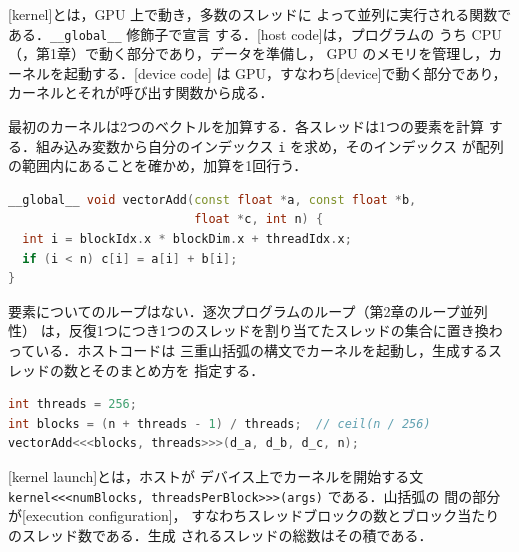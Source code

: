 \documentclass[../main.tex]{subfiles}
\begin{document}
\begin{definition}
  [kernel]とは，GPU 上で動き，多数のスレッドに
  よって並列に実行される関数である．\texttt{\_\_global\_\_} 修飾子で宣言
  する．[host code]は，プログラムの
  うち CPU（，第1章）で動く部分であり，データを準備し，
  GPU のメモリを管理し，カーネルを起動する．[device code]
  は GPU，すなわち[device]で動く部分であり，
  カーネルとそれが呼び出す関数から成る．
\end{definition}

最初のカーネルは2つのベクトルを加算する．各スレッドは1つの要素を計算
する．組み込み変数から自分のインデックス \texttt{i} を求め，そのインデックス
が配列の範囲内にあることを確かめ，加算を1回行う．
\begin{lstlisting}[language=C++, numbers=none]
__global__ void vectorAdd(const float *a, const float *b,
                          float *c, int n) {
  int i = blockIdx.x * blockDim.x + threadIdx.x;
  if (i < n) c[i] = a[i] + b[i];
}
\end{lstlisting}
要素についてのループはない．逐次プログラムのループ（第2章のループ並列性）
は，反復1つにつき1つのスレッドを割り当てたスレッドの集合に置き換わっている．ホストコードは
三重山括弧の構文でカーネルを起動し，生成するスレッドの数とそのまとめ方を
指定する．
\begin{lstlisting}[language=C++, numbers=none]
int threads = 256;
int blocks = (n + threads - 1) / threads;  // ceil(n / 256)
vectorAdd<<<blocks, threads>>>(d_a, d_b, d_c, n);
\end{lstlisting}

\begin{definition}
  [kernel launch]とは，ホストが
  デバイス上でカーネルを開始する文
  \texttt{kernel<<<numBlocks, threadsPerBlock>>>(args)} である．山括弧の
  間の部分が[execution configuration]，
  すなわちスレッドブロックの数とブロック当たりのスレッド数である．生成
  されるスレッドの総数はその積である．
\end{definition}
\end{document}
